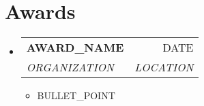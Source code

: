 \documentclass[letterpaper,10pt]{article}
\makeatletter
\newcommand{\resumeItem}[1]{
  \item\small{#1}
}
\newcommand{\resumeSubheading}[4]{
  \vspace{1pt}
  \item
    \begin{tabular*}{0.97\textwidth}[t]{l@{\extracolsep{\fill}}r}
      \textbf{#1} & #2 \\
      \textit{#3} & \textit{#4} \\
    \end{tabular*}\vspace{1pt}
}
\makeatother
\begin{document}
\section{Awards}
\begin{itemize}[leftmargin=0.15in, label={}]
    \resumeSubheading
      {AWARD\_NAME}{DATE}
      {ORGANIZATION}{LOCATION}
      \begin{itemize}[leftmargin=0.15in, label=\textbullet]
        \resumeItem{BULLET\_POINT}
      \end{itemize}
\end{itemize}
\end{document}
